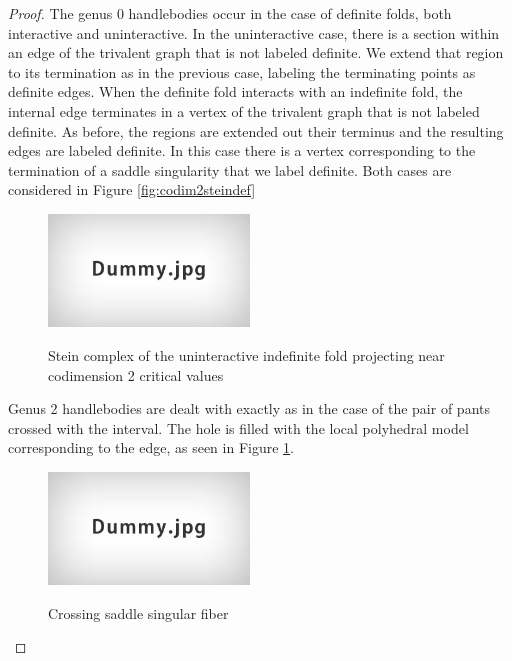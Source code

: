 \begin{proof}
													The genus 0 handlebodies occur in the case of definite folds, both interactive and uninteractive.
													In the uninteractive case, there is a section within an edge of the trivalent graph that is not labeled definite.
													We extend that region to its termination as in the previous case, labeling the terminating points as definite edges.
													When the definite fold interacts with an indefinite fold, the internal edge terminates in a vertex of the trivalent graph that is not labeled definite.
													As before, the regions are extended out their terminus and the resulting edges are labeled definite.
													In this case there is a vertex corresponding to the termination of a saddle singularity that we label definite.
													Both cases are considered in Figure \ref{fig:codim2steindef}
													
													\begin{figure}
														\centering
														\captionsetup{justification=centering}
														\caption{Stein complex of the uninteractive indefinite fold projecting near codimension 2 critical values}
														\includegraphics[height=3cm]{figures/dummy.jpg}
														\label{fig:codim2steinindefun}
													\end{figure}
													
													Genus 2 handlebodies are dealt with exactly as in the case of the pair of pants crossed with the interval.
													The hole is filled with the local polyhedral model corresponding to the edge, as seen in Figure \ref{fig:codim2steinindefun}.
													
													\begin{figure}
														\centering
														\captionsetup{justification=centering}
														\caption{Crossing saddle singular fiber}
														\includegraphics[height=3cm]{figures/dummy.jpg}
														\label{fig:crossingsaddles}
													\end{figure}
													

\end{proof}
